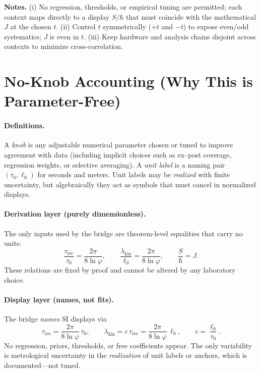 \documentclass[11pt]{article}
\theoremstyle{plain}
\theoremstyle{definition}
\theoremstyle{remark}
\begin{document}
\textbf{Notes.}
(i) No regression, thresholds, or empirical tuning are permitted; each context maps directly to a display \(S/\hbar\) that must coincide with the mathematical \(J\) at the chosen \(t\).
(ii) Control \(t\) symmetrically (\(+t\) and \(-t\)) to expose even/odd systematics; \(J\) is even in \(t\).
(iii) Keep hardware and analysis chains disjoint across contexts to minimize cross-correlation.

\section{No-Knob Accounting (Why This is Parameter-Free)}

\paragraph{Definitions.}
A \emph{knob} is any adjustable numerical parameter chosen or tuned to improve agreement with data (including implicit choices such as ex–post coverage, regression weights, or selective averaging). A \emph{unit label} is a naming pair \((\tau_{0},\ell_{0})\) for seconds and meters. Unit labels may be \emph{realized} with finite uncertainty, but algebraically they act as symbols that must cancel in normalized displays.

\paragraph{Derivation layer (purely dimensionless).}
The only inputs used by the bridge are theorem-level equalities that carry no units:
\[
\frac{\tau_{\mathrm{rec}}}{\tau_{0}}=\frac{2\pi}{8\ln\varphi},\qquad
\frac{\lambda_{\mathrm{kin}}}{\ell_{0}}=\frac{2\pi}{8\ln\varphi},\qquad
\frac{S}{\hbar}=J.
\]
These relations are fixed by proof and cannot be altered by any laboratory choice.

\paragraph{Display layer (names, not fits).}
The bridge \emph{names} SI displays via
\[
\tau_{\mathrm{rec}}=\frac{2\pi}{8\ln\varphi}\,\tau_{0},\qquad
\lambda_{\mathrm{kin}}=c\,\tau_{\mathrm{rec}}=\frac{2\pi}{8\ln\varphi}\,\ell_{0},\qquad
c=\frac{\ell_{0}}{\tau_{0}}.
\]
No regression, priors, thresholds, or free coefficients appear. The only variability is metrological uncertainty in the \emph{realization} of unit labels or anchors, which is documented—not tuned.
\end{document}

